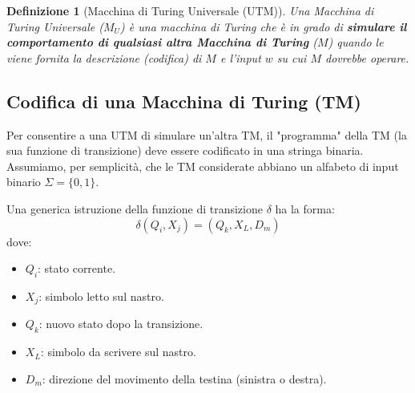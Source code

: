 \documentclass[a4paper]{article}
\newtheorem{definition}{Definizione}
\begin{document}
\begin{definition}[Macchina di Turing Universale (UTM)]
Una Macchina di Turing Universale ($M_U$) è una macchina di Turing che è in grado di \textbf{simulare il comportamento di qualsiasi altra Macchina di Turing} ($M$) quando le viene fornita la descrizione (codifica) di $M$ e l'input $w$ su cui $M$ dovrebbe operare.
\end{definition}

\subsection{Codifica di una Macchina di Turing (TM)}

Per consentire a una UTM di simulare un'altra TM, il "programma" della TM (la sua funzione di transizione) deve essere codificato in una stringa binaria. Assumiamo, per semplicità, che le TM considerate abbiano un alfabeto di input binario $\Sigma = \{0,1\}$.

Una generica istruzione della funzione di transizione $\delta$ ha la forma:
\[ \delta(Q_i, X_j) = (Q_k, X_L, D_m) \]
dove:
\begin{itemize}
    \item $Q_i$: stato corrente.
    \item $X_j$: simbolo letto sul nastro.
    \item $Q_k$: nuovo stato dopo la transizione.
    \item $X_L$: simbolo da scrivere sul nastro.
    \item $D_m$: direzione del movimento della testina (sinistra o destra).
\end{itemize}
\end{document}
